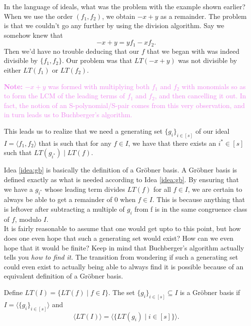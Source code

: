 \documentclass[11pt]{article}
\newcommand{\gb}{Gr\"{o}bner }
\newcommand*{\ideal}[1]{\langle#1\rangle}
\begin{document}
In the language of ideals, what was the problem with the example shown earlier? When we use the order $(f_1, f_2)$, we obtain $-x + y$ as a remainder. The problem is that we couldn't go any further by using the division algorithm. Say we somehow knew that
\[
-x + y = yf_1 - xf_2.
\]
Then we'd have no trouble deducing that our $f$ that we began with was indeed divisible by $\{f_1, f_2\}$. Our problem was that $LT(-x+y)$ was not divisible by either $LT(f_1)$ or $LT(f_2)$. 

\begin{mdframed}
\textcolor{Violet}{\textbf{Note:} $-x + y$ was formed with multiplying both $f_1$ and $f_2$ with monomials so as to form the LCM of the leading terms of $f_1$ and $f_2$, and then cancelling it out. In fact, the notion of an S-polynomial/S-pair comes from this very observation, and in turn leads us to Buchberger's algorithm.}
\end{mdframed}

\begin{ideabox}
\label{idea:gb}
This leads us to realize that we need a generating set $\{g_i\}_{i \in [s]}$ of our ideal $I = \ideal{f_1, f_2}$ that is such that for any $f \in I$, we have that there exists an $i^* \in [s]$ such that $LT(g_{i^*}) \mid LT(f)$.
\end{ideabox}

Idea \ref{idea:gb} is basically the definition of a \gb basis. A \gb basis is defined exactly as what is needed according to Idea \ref{idea:gb}. By ensuring that we have a $g_{i^*}$ whose leading term divides $LT(f)$ for all $f \in I$, we are certain to always be able to get a remainder of $0$ when $f \in I$. This is because anything that is leftover after subtracting a multiple of $g_i$ from f is in the same congruence class of $f$, modulo $I$. \\

It is fairly reasonable to assume that one would get upto to this point, but how does one even hope that such a generating set would exist? How can we even hope that it would be finite? Keep in mind that Buchberger's algorithm actually tells you \emph{how to find it.} The transition from wondering if such a generating set could even exist to actually being able to always find it is possible because of an equivalent definition of a \gb basis.

\begin{definition}
\label{def:gb-as-ideals}
Define $LT(I) = \{LT(f) \mid f \in I\}$. The set $\{g_i\}_{i \in [s]} \subseteq I$ is a \gb basis if $I = \ideal{\{g_i\}_{i \in [s]}}$ and
\[
\ideal{LT(I)} = \ideal{\{LT(g_i) \mid i \in [s]\}}.
\]
\end{definition}
\end{document}
